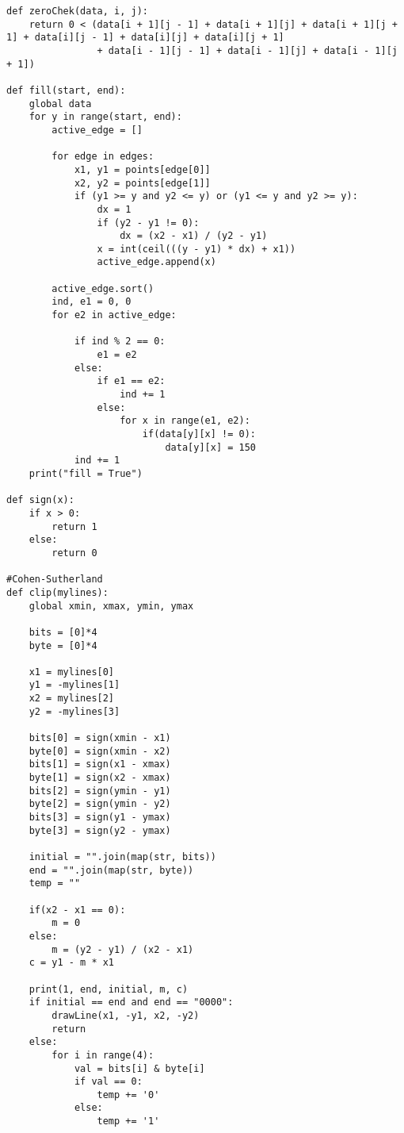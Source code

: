 \documentclass[a4paper, 14pt]{extarticle}
\begin{document}
\begin{verbatim}
def zeroChek(data, i, j):
    return 0 < (data[i + 1][j - 1] + data[i + 1][j] + data[i + 1][j + 1] + data[i][j - 1] + data[i][j] + data[i][j + 1]
                + data[i - 1][j - 1] + data[i - 1][j] + data[i - 1][j + 1])

def fill(start, end): 
    global data
    for y in range(start, end):
        active_edge = []

        for edge in edges:
            x1, y1 = points[edge[0]]
            x2, y2 = points[edge[1]]
            if (y1 >= y and y2 <= y) or (y1 <= y and y2 >= y):
                dx = 1
                if (y2 - y1 != 0):
                    dx = (x2 - x1) / (y2 - y1)
                x = int(ceil(((y - y1) * dx) + x1))
                active_edge.append(x)

        active_edge.sort()
        ind, e1 = 0, 0
        for e2 in active_edge:

            if ind % 2 == 0:
                e1 = e2
            else:
                if e1 == e2:
                    ind += 1
                else:
                    for x in range(e1, e2):
                        if(data[y][x] != 0):
                            data[y][x] = 150
            ind += 1
    print("fill = True")

def sign(x):
    if x > 0:
        return 1
    else:
        return 0

#Cohen-Sutherland
def clip(mylines):
    global xmin, xmax, ymin, ymax

    bits = [0]*4
    byte = [0]*4

    x1 = mylines[0]
    y1 = -mylines[1]
    x2 = mylines[2]
    y2 = -mylines[3]

    bits[0] = sign(xmin - x1)
    byte[0] = sign(xmin - x2)
    bits[1] = sign(x1 - xmax)
    byte[1] = sign(x2 - xmax)
    bits[2] = sign(ymin - y1)
    byte[2] = sign(ymin - y2)
    bits[3] = sign(y1 - ymax)
    byte[3] = sign(y2 - ymax)

    initial = "".join(map(str, bits))
    end = "".join(map(str, byte))
    temp = ""

    if(x2 - x1 == 0):
        m = 0
    else:
        m = (y2 - y1) / (x2 - x1)
    c = y1 - m * x1
    
    print(1, end, initial, m, c)
    if initial == end and end == "0000":
        drawLine(x1, -y1, x2, -y2)
        return
    else:
        for i in range(4):
            val = bits[i] & byte[i]
            if val == 0:
                temp += '0'
            else:
                temp += '1'


\end{verbatim}
\end{document}
